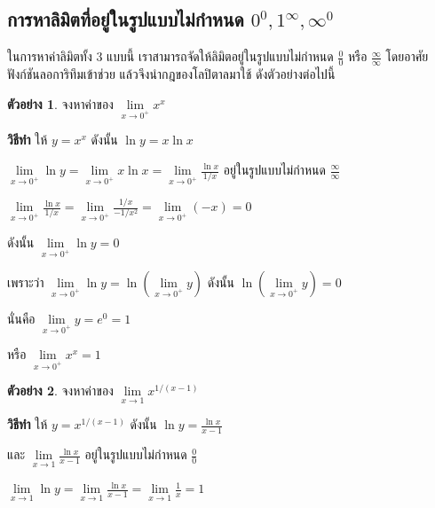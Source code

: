 \documentclass[
]{book}
\theoremstyle{definition}
\theoremstyle{definition}
\newtheorem{example}{ตัวอย่าง}[chapter]
\theoremstyle{definition}
\theoremstyle{definition}
\theoremstyle{remark}
\begin{document}
\subsection{\texorpdfstring{การหาลิมิตที่อยู่ในรูปแบบไม่กำหนด \(0^{0}, 1^{\infty}, \infty^0\)}{การหาลิมิตที่อยู่ในรูปแบบไม่กำหนด 0\^{}\{0\}, 1\^{}\{\textbackslash infty\}, \textbackslash infty\^{}0}}\label{uxe01uxe32uxe23uxe2buxe32uxe25uxe21uxe15uxe17uxe2duxe22uxe43uxe19uxe23uxe1buxe41uxe1auxe1auxe44uxe21uxe01uxe33uxe2buxe19uxe14-00-1infty-infty0}

ในการหาค่าลิมิตทั้ง 3 แบบนี้ เราสามารถจัดให้ลิมิตอยู่ในรูปแบบไม่กำหนด
\(\displaystyle \frac{0}{0}\) หรือ \(\displaystyle \frac{\infty }{\infty }\)
โดยอาศัยฟังก์ชันลอการิทึมเข้าช่วย แล้วจึงนำกฎของโลปิตาลมาใช้ ดังตัวอย่างต่อไปนี้

\begin{example}
จงหาค่าของ \(\mathop {\lim }\limits_{x\to 0^+} x^x\)
\end{example}

\textbf{วิธีทำ} ให้ \(y=x^x\) ดังนั้น \(\ln y=x\ln x\)

\(\displaystyle \mathop {\lim }\limits_{x\to 0^+} \ln y=\mathop {\lim
}\limits_{x\to 0^+}
x\ln x=\mathop {\lim }\limits_{x\to 0^+} \frac{\ln x}{1/x}\)
อยู่ในรูปแบบไม่กำหนด \(\displaystyle \frac{\infty }{\infty }\)

\(\displaystyle \mathop {\lim }\limits_{x\to 0^+} \frac{\ln x}{1/x}=\mathop
{\lim
}\limits_{x\to 0^+} \frac{1/x}{-1/x^2}=\mathop {\lim }\limits_{x\to 0^+}
(-x)=0\)

ดังนั้น \(\mathop {\lim }\limits_{x\to 0^+} \ln y=0\)

เพราะว่า \(\mathop {\lim }\limits_{x\to 0^+} \ln y=\ln (\mathop {\lim
}\limits_{x\to 0^+} y)\) ดังนั้น \(\ln (\mathop {\lim }\limits_{x\to 0^+}
y)=0\)

นั่นคือ \(\mathop {\lim }\limits_{x\to 0^+} y=e^0=1\)

หรือ \(\mathop {\lim }\limits_{x\to 0^+} x^x=1\)

\begin{example}
จงหาค่าของ \(\mathop {\lim }\limits_{x\to 1} x^{1/(x-1)}\)
\end{example}

\textbf{วิธีทำ} ให้ \(y=x^{1/(x-1)}\) ดังนั้น \(\displaystyle \ln y=\frac{\ln x}{x-1}\)

และ \(\displaystyle \mathop {\lim }\limits_{x\to 1} \frac{\ln x}{x-1}\)
อยู่ในรูปแบบไม่กำหนด \(\displaystyle \frac{0}{0}\)

\(\displaystyle \mathop {\lim }\limits_{x\to 1} \ln y=\mathop {\lim
}\limits_{x\to 1}
\frac{\ln x}{x-1}=\mathop {\lim }\limits_{x\to 1} \frac{1}{x}=1\)
\end{document}
